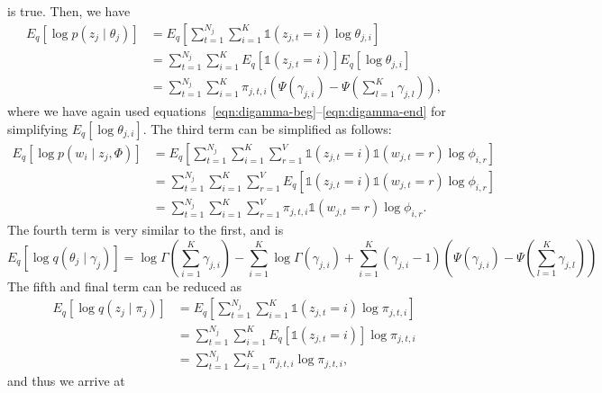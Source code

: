 \documentclass[11pt]{article}
\begin{document}
is true. Then, we have
\begin{align}
  E_q\left[\log p(z_j \mid \theta_j)\right]
  &=
  E_q\left[\sum_{t=1}^{N_j} \sum_{i=1}^K \mathbb{1}(z_{j,t} = i)\log
  \theta_{j,i}\right]
  \\&=
  \sum_{t=1}^{N_j} \sum_{i=1}^K E_q[\mathbb{1}(z_{j,t} = i)]E_q[\log
  \theta_{j,i}]
  \\&=
  \sum_{t=1}^{N_j} \sum_{i=1}^K \pi_{j,t,i}
  \left(\Psi(\gamma_{j,i}) - \Psi\left(\sum_{l=1}^K \gamma_{j,l}\right)\right),
\end{align}
where we have again used
equations~\ref{eqn:digamma-beg}--\ref{eqn:digamma-end} for simplifying
$E_q[\log \theta_{j,i}]$. The third term can be simplified as follows:
\begin{align}
  E_q\left[\log p(w_i \mid z_j, \Phi)\right]
  &=
  E_q\left[
    \sum_{t=1}^{N_j} \sum_{i=1}^K \sum_{r=1}^V
    \mathbb{1}(z_{j,t} = i)\mathbb{1}(w_{j,t} = r)\log \phi_{i,r}
  \right]
  \\&=
  \sum_{t=1}^{N_j} \sum_{i=1}^K \sum_{r=1}^V
  E_q[\mathbb{1}(z_{j,t} = i)
  \mathbb{1}(w_{j,t} = r)
  \log \phi_{i,r}]
  \\&=
  \sum_{t=1}^{N_j} \sum_{i=1}^K \sum_{r=1}^V
  \pi_{j,t,i} \mathbb{1}(w_{j,t} = r) \log \phi_{i,r}.
\end{align}
The fourth term is very similar to the first, and is
\begin{equation}
  E_q\left[\log q(\theta_j \mid \gamma_j) \right]
  =
  \log \Gamma\left(\sum_{i=1}^K \gamma_{j,i}\right)
  - \sum_{i=1}^K \log \Gamma(\gamma_{j,i})
  + \sum_{i=1}^K (\gamma_{j,i} - 1)
  \left(\Psi(\gamma_{j,i}) - \Psi\left(\sum_{l=1}^K \gamma_{j,l}\right)\right)
\end{equation}
The fifth and final term can be reduced as
\begin{align}
  E_q\left[\log q(z_j \mid \pi_j)\right]
  &=
  E_q\left[
    \sum_{t=1}^{N_j} \sum_{i=1}^K
    \mathbb{1}(z_{j,t} = i) \log \pi_{j,t,i}
  \right]
  \\&=
  \sum_{t=1}^{N_j} \sum_{i=1}^K
  E_q[\mathbb{1}(z_{j,t} = i)] \log \pi_{j,t,i}
  \\&=
  \sum_{t=1}^{N_j} \sum_{i=1}^K
  \pi_{j,t,i} \log \pi_{j,t,i},
\end{align}
and thus we arrive at
\end{document}
